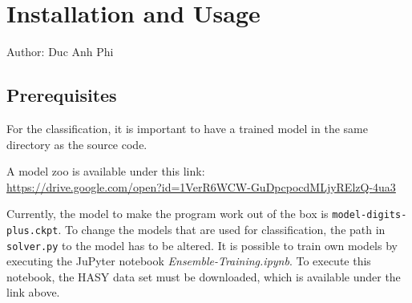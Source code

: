 \documentclass[11pt]{article}
\begin{document}

	
	
	\pagebreak
	\section{Installation and Usage}
	\small{Author: Duc Anh Phi}\\
	\subsection{Prerequisites}
	For the classification, it is important to have a trained model in the same directory as the source code.
	
	A model zoo is available under this link: \\
	\url{https://drive.google.com/open?id=1VerR6WCW-GuDpcpocdMLjyRElzQ-4ua3}
	
	Currently, the model to make the program work out of the box is \texttt{model-digits-plus.ckpt}. To change the models that are used for classification, the path in \texttt{solver.py} to the model has to be altered.
	It is possible to train own models by executing the JuPyter notebook \textit{Ensemble-Training.ipynb}. To execute this notebook, the HASY data set must be downloaded, which is available under the link above. 
\end{document}
